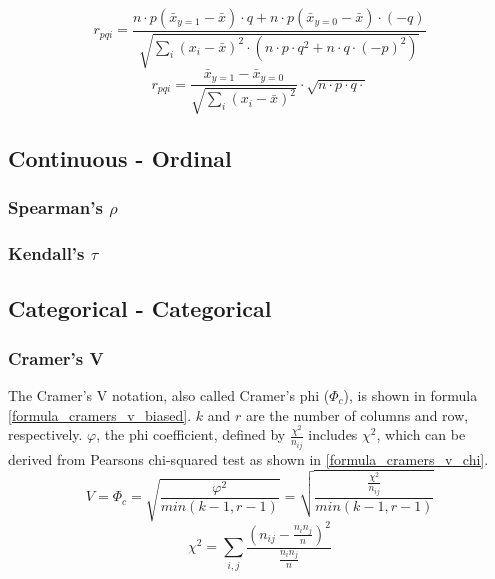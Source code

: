 \documentclass[a4paper,12pt]{report}
\begin{document}
\begin{equation}
\label{formula_point_biserial_from_pearson}
	r_{pqi} =  \frac{n \cdot p (\bar{x}_{y=1}-\bar{x}) \cdot q + n \cdot p (\bar{x}_{y=0}-\bar{x}) \cdot (-q)}{\sqrt{\sum_{i}{(x_i-\bar{x})^2} \cdot (n \cdot p \cdot q^2 + n \cdot q \cdot (-p)^2)}}
\end{equation}
\begin{equation}
\label{formula_point_biserial}
	r_{pqi} =  \frac{\bar{x}_{y=1}-\bar{x}_{y=0}}{\sqrt{\sum_{i}{(x_i-\bar{x})^2}}} \cdot \sqrt{n \cdot p \cdot q \cdot} 
\end{equation}

\bigskip


\subsection{Continuous - Ordinal}

\subsubsection{Spearman's $\rho$}

%

\subsubsection{Kendall's $\tau$}

%




\subsection{Categorical - Categorical}

\subsubsection{Cramer’s V}

The Cramer’s V notation, also called Cramer's phi ($\Phi_c$), is shown in formula \ref{formula_cramers_v_biased}. $k$ and $r$ are the number of columns and row, respectively. $\varphi$, the phi coefficient, defined by $\frac{{\chi^2}}{n_{ij}}$ includes $\chi^2$, which can be derived from Pearsons chi-squared test as shown in \ref{formula_cramers_v_chi}. \cite{Sheskin1997,Bergsma2013}
\smallskip
\begin{equation}
\label{formula_cramers_v_biased}
	V = \Phi_c =  \sqrt{\frac{{\varphi^2}}{min(k-1,r-1)}} = \sqrt{\frac{\frac{{\chi^2}}{n_{ij}}}{min(k-1,r-1)}}
\end{equation}
\begin{equation}
\label{formula_cramers_v_chi}
	\chi^2 =  \sum_{i,j}{\frac{(n_{ij}-\frac{n_i n_j}{n})^2}{\frac{n_i n_j}{n}}}
\end{equation}
\end{document}
